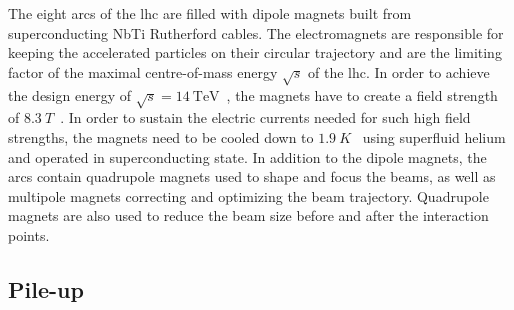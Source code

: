 The eight arcs of the \gls{lhc} are filled with dipole magnets built from superconducting NbTi Rutherford cables. The electromagnets are responsible for keeping the accelerated particles on their circular trajectory and are the limiting factor of the maximal centre-of-mass energy $\sqrt{s}$ of the \gls{lhc}. In order to achieve the design energy of $\sqrt{s} = \SI{14}{\TeV}$~\cite{Bruning:782076}, the magnets have to create a field strength of $\SI{8.3}{T}$~\cite{Evans:1129806}. In order to sustain the electric currents needed for such high field strengths, the magnets need to be cooled down to $\SI{1.9}{K}$~\cite{Evans:1129806} using superfluid helium and operated in superconducting state. In addition to the dipole magnets, the arcs contain quadrupole magnets used to shape and focus the beams, as well as multipole magnets correcting and optimizing the beam trajectory. Quadrupole magnets are also used to reduce the beam size before and after the interaction points.

\subsection{Pile-up}\label{sec:pileup}

